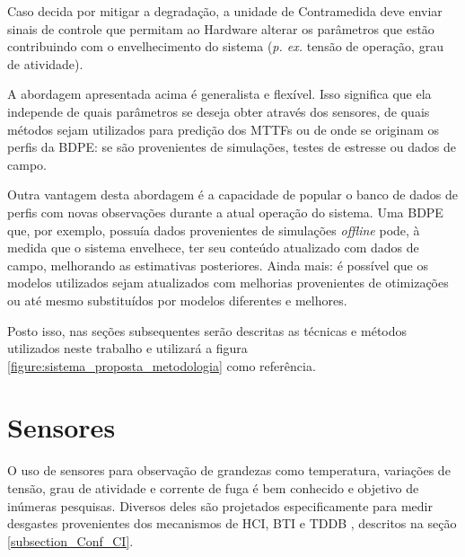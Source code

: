 Caso decida por mitigar a degradação, a unidade de Contramedida deve enviar sinais de controle que permitam ao Hardware alterar os parâmetros que estão contribuindo com o envelhecimento do sistema (\textit{p. ex.} tensão de operação, grau de atividade).

A abordagem apresentada acima é generalista e flexível. Isso significa que ela independe de quais parâmetros se deseja obter através dos sensores, de quais métodos sejam utilizados para predição dos MTTFs ou de onde se originam os perfis da BDPE: se são provenientes de simulações, testes de estresse ou dados de campo.

Outra vantagem desta abordagem é a capacidade de popular o banco de dados de perfis com novas observações durante a atual operação do sistema. Uma BDPE que, por exemplo, possuía dados provenientes de simulações \textit{offline} pode, à medida que o sistema envelhece, ter seu conteúdo atualizado com dados de campo, melhorando as estimativas posteriores. Ainda mais: é possível que os modelos utilizados sejam atualizados com melhorias provenientes de otimizações ou até mesmo substituídos por modelos diferentes e melhores.

Posto isso, nas seções subsequentes serão descritas as técnicas e métodos utilizados neste trabalho e utilizará a figura \ref{figure:sistema_proposta_metodologia} como referência.

\section{Sensores}
O uso de sensores para observação de grandezas como temperatura, variações de tensão, grau de atividade e corrente de fuga é bem conhecido e objetivo de inúmeras pesquisas. Diversos deles são projetados especificamente para medir desgastes provenientes dos mecanismos de HCI, BTI e TDDB \cite{Kim2010}\cite{Keane2010}\cite{Kim2008}\cite{Karl2008}, descritos na seção \ref{subsection_Conf_CI}.

